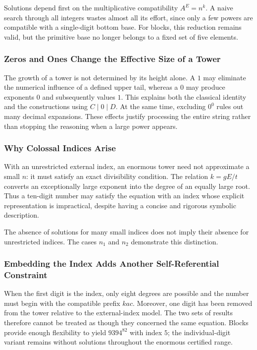 \documentclass[11pt,a4paper]{article}
\begin{document}
Solutions depend first on the multiplicative compatibility $A^E=n^k$. A naive search through all integers wastes almost all its effort, since only a few powers are compatible with a single-digit bottom base. For blocks, this reduction remains valid, but the primitive base no longer belongs to a fixed set of five elements.

\subsubsection{Zeros and Ones Change the Effective Size of a Tower}

The growth of a tower is not determined by its height alone. A $1$ may eliminate the numerical influence of a defined upper tail, whereas a $0$ may produce exponents $0$ and subsequently values $1$. This explains both the classical identity and the constructions using $C\mid0\mid D$. At the same time, excluding $0^0$ rules out many decimal expansions. These effects justify processing the entire string rather than stopping the reasoning when a large power appears.

\subsubsection{Why Colossal Indices Arise}

With an unrestricted external index, an enormous tower need not approximate a small $n$: it must satisfy an exact divisibility condition. The relation $k=gE/t$ converts an exceptionally large exponent into the degree of an equally large root. Thus a ten-digit number may satisfy the equation with an index whose explicit representation is impractical, despite having a concise and rigorous symbolic description.

The absence of solutions for many small indices does not imply their absence for unrestricted indices. The cases $n_1$ and $n_2$ demonstrate this distinction.

\subsubsection{Embedding the Index Adds Another Self-Referential Constraint}

When the first digit is the index, only eight degrees are possible and the number must begin with the compatible prefix $kac$. Moreover, one digit has been removed from the tower relative to the external-index model. The two sets of results therefore cannot be treated as though they concerned the same equation. Blocks provide enough flexibility to yield $9394^{82}$ with index $5$; the individual-digit variant remains without solutions throughout the enormous certified range.
\end{document}
